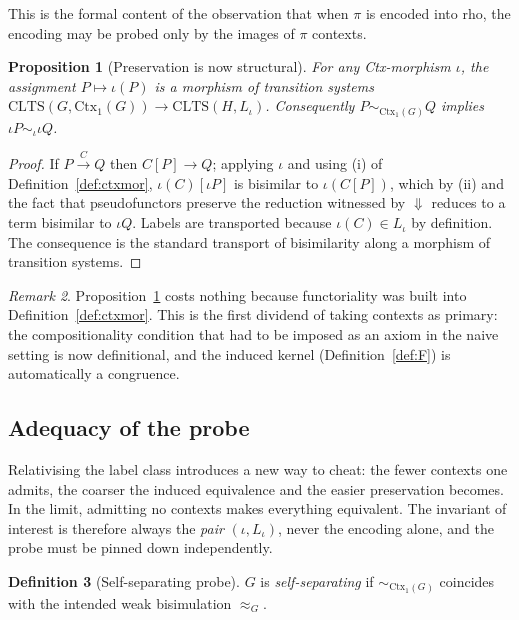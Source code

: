 \documentclass[11pt,a4paper]{article}
\theoremstyle{definition}
\newtheorem{definition}{Definition}[section]
\theoremstyle{plain}
\newtheorem{proposition}[definition]{Proposition}
\theoremstyle{remark}
\newtheorem{remark}[definition]{Remark}
\newcommand{\Ctx}{\mathrm{Ctx}}
\newcommand{\bisim}{\approx}
\newcommand{\obs}{\Downarrow}
\begin{document}
This is the formal content of the observation that when $\pi$ is encoded into rho,
the encoding may be probed only by the images of $\pi$ contexts.

\begin{proposition}[Preservation is now structural]
\label{prop:preserve}
For any Ctx-morphism $\iota$, the assignment $P \mapsto \iota(P)$ is a morphism of
transition systems
$\mathrm{CLTS}(G,\Ctx_1(G)) \to \mathrm{CLTS}(H,L_\iota)$.
Consequently $P \sim_{\Ctx_1(G)} Q$ implies $\iota P \sim_\iota \iota Q$.
\end{proposition}

\begin{proof}
If $P \xrightarrow{C} Q$ then $C[P] \to Q$; applying $\iota$ and using (i) of
Definition~\ref{def:ctxmor}, $\iota(C)[\iota P]$ is bisimilar to $\iota(C[P])$, which
by (ii) and the fact that pseudofunctors preserve the reduction witnessed by $\obs$
reduces to a term bisimilar to $\iota Q$. Labels are transported because
$\iota(C) \in L_\iota$ by definition. The consequence is the standard transport of
bisimilarity along a morphism of transition systems.
\end{proof}

\begin{remark}
\label{rem:kernel-congruence}
Proposition~\ref{prop:preserve} costs nothing because functoriality was built into
Definition~\ref{def:ctxmor}. This is the first dividend of taking contexts as
primary: the compositionality condition that had to be imposed as an axiom in the
naive setting is now definitional, and the induced kernel (Definition~\ref{def:F})
is automatically a congruence.
\end{remark}

\subsection{Adequacy of the probe}

Relativising the label class introduces a new way to cheat: the fewer contexts one
admits, the coarser the induced equivalence and the easier preservation becomes. In
the limit, admitting no contexts makes everything equivalent. The invariant of
interest is therefore always the \emph{pair} $(\iota, L_\iota)$, never the encoding
alone, and the probe must be pinned down independently.

\begin{definition}[Self-separating probe]
\label{def:selfsep}
$G$ is \emph{self-separating} if $\sim_{\Ctx_1(G)}$ coincides with the intended
weak bisimulation $\bisim_G$.
\end{definition}
\end{document}
